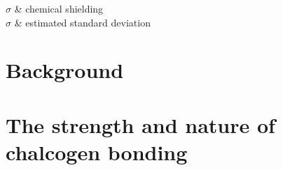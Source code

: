 \documentclass[a4paper, 12pt]{Thesis}  %
\begin{document}

\clearpage  %
{
$\sigma$ & chemical shielding\\
$\sigma$ & estimated standard deviation\\
}

\clearpage

\mainmatter	  %
\pagestyle{fancy}  %


\part{Background}





\part{The strength and nature of chalcogen bonding}
\end{document}
